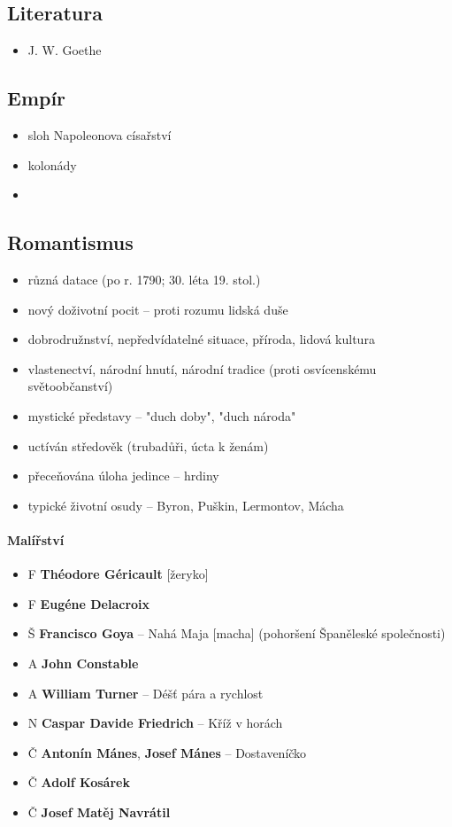 \subsection{Literatura}
\begin{itemize}
\item J. W. Goethe
\end{itemize}


\subsection{Empír}
\begin{itemize}
\item sloh Napoleonova císařství
\item kolonády
\item 
\end{itemize}

\subsection{Romantismus}
\begin{itemize}
\item různá datace (po r. 1790; 30. léta 19. stol.)
\item nový doživotní pocit -- proti rozumu lidská duše
\item dobrodružnství, nepředvídatelné situace, příroda, lidová kultura
\item vlastenectví, národní hnutí, národní tradice (proti osvícenskému světoobčanství)
\item mystické představy -- "duch doby", "duch národa"
\item uctíván středověk (trubadůři, úcta k ženám)
\item přeceňována úloha jedince -- hrdiny
\item typické životní osudy -- Byron, Puškin, Lermontov, Mácha
\end{itemize}

\paragraph{Malířství}
\begin{itemize}
\item F \textbf{Théodore Géricault} [žeryko] 
\item F \textbf{Eugéne Delacroix}
\item Š \textbf{Francisco Goya} -- Nahá Maja [macha] (pohoršení Španěleské společnosti)
\item A \textbf{John Constable} 
\item A \textbf{William Turner} -- Déšť pára a rychlost
\item N \textbf{Caspar Davide Friedrich} -- Kříž v horách
\item Č \textbf{Antonín Mánes}, \textbf{Josef Mánes} -- Dostaveníčko
\item Č \textbf{Adolf Kosárek} 
\item Č \textbf{Josef Matěj Navrátil}
\end{itemize}

